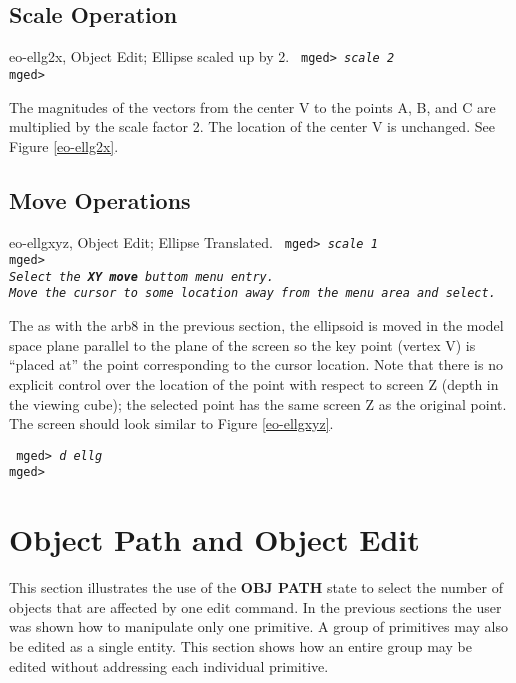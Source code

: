 \subsection{Scale Operation}

\mfig eo-ellg2x, Object Edit; Ellipse scaled up by 2.
\noindent
{\tt
mged> {\em scale 2}\\
mged>\\
}

The magnitudes of the vectors from the center V to the points A, B, and C
are multiplied by the scale factor 2.  The location of the center V is
unchanged.  See Figure \ref{eo-ellg2x}.

\subsection{Move Operations}

\mfig eo-ellgxyz, Object Edit; Ellipse Translated.
\noindent
{\tt
mged> {\em scale 1}\\
mged>\\
{\em Select the {\bf XY move} buttom menu entry.}\\
{\em Move the cursor to some location away from the menu area and select.}\\
}

The as with the arb8 in the previous section, the ellipsoid is moved
in the model space plane parallel to the plane of the screen so the
key point (vertex V) is ``placed at'' the point corresponding to the
cursor location.  Note that there is no explicit control over the
location of the point with respect to screen Z (depth in the viewing
cube); the selected point has the same screen Z as the original point.
The screen should look similar to Figure \ref{eo-ellgxyz}.

\noindent
{\tt
mged> {\em d ellg}\\
mged>\\
}

\section{Object Path and Object Edit}

This section illustrates the use of the {\bf OBJ PATH} state to select the
number of objects that are affected by one edit command.  In the previous
sections the user was shown how to manipulate only one primitive.  A group
of primitives may also be edited as a single entity.  This section
shows how an entire group may be edited without addressing each individual
primitive.

